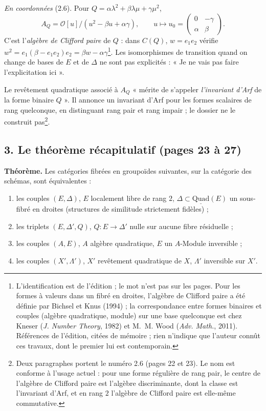 \documentclass[11pt,a4paper]{article}
\begin{document}
\emph{En coordonnées} (2.6). Pour $Q = \alpha\lambda^{2} + \beta\lambda\mu + \gamma\mu^{2}$,
\[
  A_Q = \mathcal{O}[u]/(u^{2} - \beta u + \alpha\gamma), \qquad
  u \longmapsto u_0 = \begin{pmatrix} 0 & -\gamma \\ \alpha & \beta \end{pmatrix}.
\]
C'est l'\emph{algèbre de Clifford paire} de $Q$ : dans $C(Q)$, $w = e_1e_2$ vérifie
$w^{2} = e_1(\beta - e_1e_2)e_2 = \beta w - \alpha\gamma$\footnote{L'identification
est de l'édition ; le mot n'est pas sur les pages. Pour les formes à valeurs dans
un fibré en droites, l'algèbre de Clifford paire a été définie par Bichsel et
Knus (1994) ; la correspondance entre formes binaires et couples (algèbre
quadratique, module) sur une base quelconque est chez Kneser (\emph{J. Number
Theory}, 1982) et M.~M. Wood (\emph{Adv. Math.}, 2011). Références de l'édition,
citées de mémoire ; rien n'indique que l'auteur connût ces travaux, dont le
premier lui est contemporain.}. Les isomorphismes de transition quand on change
de bases de $E$ et de $\Delta$ ne sont pas explicités : « Je ne vais pas faire
l'explicitation ici ».

Le revêtement quadratique associé à $A_Q$ « mérite de s'appeler \emph{l'invariant
d'Arf} de la forme binaire $Q$ ». Il annonce un invariant d'Arf pour les formes
scalaires de rang quelconque, en distinguant rang pair et rang impair ; le dossier
ne le construit pas\footnote{Deux paragraphes portent le numéro 2.6 (pages 22 et
23). Le nom est conforme à l'usage actuel : pour une forme régulière de rang pair,
le centre de l'algèbre de Clifford paire est l'algèbre discriminante, dont la
classe est l'invariant d'Arf, et en rang $2$ l'algèbre de Clifford paire est
elle-même commutative.}.

\subsection*{3. Le théorème récapitulatif (pages 23 à 27)}

\textbf{Théorème.} Les catégories fibrées en groupoïdes suivantes, sur la catégorie
des schémas, sont équivalentes :
\begin{enumerate}
\item[(1)] les couples $(E, \Delta)$, $E$ localement libre de rang $2$, $\Delta \subset
\underline{\mathrm{Quad}}(E)$ un sous-fibré en droites (structures de similitude
strictement fidèles) ;
\item[(1')] les triplets $(E, \Delta', Q)$, $Q : E \to \Delta'$ nulle sur aucune fibre
résiduelle ;
\item[(2)] les couples $(A, E)$, $A$ algèbre quadratique, $E$ un $A$-Module inversible ;
\item[(2')] les couples $(X', \Lambda')$, $X'$ revêtement quadratique de $X$, $\Lambda'$
inversible sur $X'$.
\end{enumerate}
\end{document}
